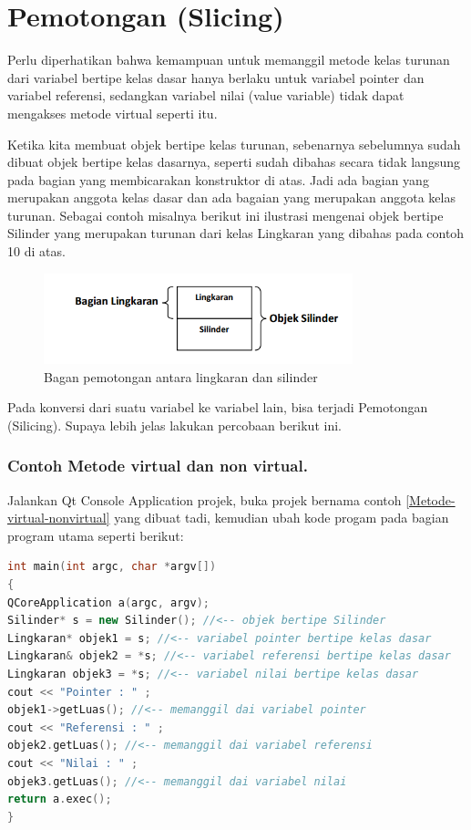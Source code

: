 \section{Pemotongan (Slicing)}\label{pemotongan-slicing}

Perlu diperhatikan bahwa kemampuan untuk memanggil metode kelas turunan
dari variabel bertipe kelas dasar hanya berlaku untuk variabel pointer
dan variabel referensi, sedangkan variabel nilai (value variable) tidak
dapat mengakses metode virtual seperti itu.

Ketika kita membuat objek bertipe kelas turunan, sebenarnya sebelumnya
sudah dibuat objek bertipe kelas dasarnya, seperti sudah dibahas secara
tidak langsung pada bagian yang membicarakan konstruktor di atas. Jadi
ada bagian yang merupakan anggota kelas dasar dan ada bagaian yang
merupakan anggota kelas turunan. Sebagai contoh misalnya berikut ini
ilustrasi mengenai objek bertipe Silinder yang merupakan turunan dari
kelas Lingkaran yang dibahas pada contoh 10 di atas.

\begin{figure}[htbp]
\centering
\includegraphics[width=0.8\textwidth]{images/capture7-6.png}
\caption{Bagan pemotongan antara lingkaran dan silinder}
\end{figure}

Pada konversi dari suatu variabel ke variabel lain, bisa terjadi
Pemotongan (Silicing). Supaya lebih jelas lakukan percobaan berikut ini.

\subsubsection*{Contoh  Metode virtual dan non virtual.}

Jalankan Qt Console Application projek, buka projek bernama contoh \ref{Metode-virtual-nonvirtual}
yang dibuat tadi, kemudian ubah kode progam pada bagian program utama
seperti berikut:



\begin{lstlisting}[language=c++, caption=Metode virtual dan non virtual]
int main(int argc, char *argv[])
{
QCoreApplication a(argc, argv);
Silinder* s = new Silinder(); //<-- objek bertipe Silinder
Lingkaran* objek1 = s; //<-- variabel pointer bertipe kelas dasar
Lingkaran& objek2 = *s; //<-- variabel referensi bertipe kelas dasar
Lingkaran objek3 = *s; //<-- variabel nilai bertipe kelas dasar
cout << "Pointer : " ;
objek1->getLuas(); //<-- memanggil dai variabel pointer
cout << "Referensi : " ;
objek2.getLuas(); //<-- memanggil dai variabel referensi
cout << "Nilai : " ;
objek3.getLuas(); //<-- memanggil dai variabel nilai
return a.exec();
}
\end{lstlisting}

